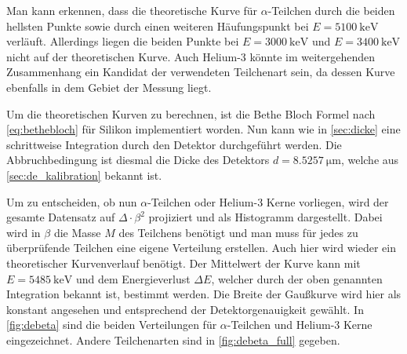 Man kann erkennen, dass die theoretische Kurve für $\alpha$-Teilchen durch die beiden hellsten Punkte sowie durch einen weiteren Häufungspunkt bei $E=\SI{5100}{\kilo\electronvolt}$ verläuft.
Allerdings liegen die beiden Punkte bei $E = \SI{3000}{\kilo\electronvolt}$ und $E=\SI{3400}{\kilo\electronvolt}$ nicht auf der theoretischen Kurve.
Auch Helium-3 könnte im weitergehenden Zusammenhang ein Kandidat der verwendeten Teilchenart sein, da dessen Kurve ebenfalls in dem Gebiet der Messung liegt.

Um die theoretischen Kurven zu berechnen, ist die Bethe Bloch Formel nach \cref{eq:bethebloch} für Silikon implementiert worden.
Nun kann wie in \cref{sec:dicke} eine schrittweise Integration durch den Detektor durchgeführt werden.
Die Abbruchbedingung ist diesmal die Dicke des Detektors $d = \SI{8.5257}{\micro\meter}$, welche aus \cref{sec:de_kalibration} bekannt ist.

Um zu entscheiden, ob nun $\alpha$-Teilchen oder Helium-3 Kerne vorliegen, wird der gesamte Datensatz auf $\Delta \cdot \beta^2$ projiziert und als Histogramm dargestellt.
Dabei wird in $\beta$ die Masse $M$ des Teilchens benötigt und man muss für jedes zu überprüfende Teilchen eine eigene Verteilung erstellen.
Auch hier wird wieder ein theoretischer Kurvenverlauf benötigt.
Der Mittelwert der Kurve kann mit $E = \SI{5485}{\kilo\electronvolt}$ und dem Energieverlust $\Delta E$, welcher durch der oben genannten Integration bekannt ist, bestimmt werden.
Die Breite der Gaußkurve wird hier als konstant angesehen und entsprechend der Detektorgenauigkeit gewählt.
In \cref{fig:debeta} sind die beiden Verteilungen für $\alpha$-Teilchen und Helium-3 Kerne eingezeichnet.
Andere Teilchenarten sind in \cref{fig:debeta_full} gegeben.

